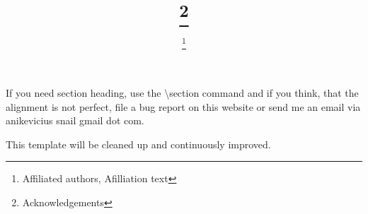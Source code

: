 \documentclass[ %
    twocolumn,  %
    10pt,       %
    advmat,     %
    ]{wileyvch} %
\title{\@JTitle{}
\thanks{Acknowledgements
}}
\author{\@JAuthor{}
\thanks{ Affiliated authors,
\newline Afilliation text
}}
\date{}
\begin{document}

\maketitle

If you need section heading, use the \textbackslash{}section command and
if you think, that the alignment is not perfect, file a bug report on
this website or send me an email via anikevicius snail gmail dot com.

This template will be cleaned up and continuously improved.


\end{document}
